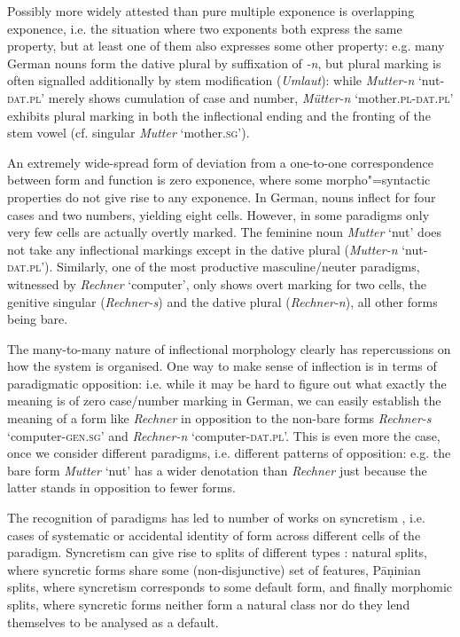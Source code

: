 \documentclass[output=paper
                ,modfonts
                ,nonflat
	        ,collection
	        ,collectionchapter
	        ,collectiontoclongg
 	        ,biblatex
                ,babelshorthands
                ,newtxmath
                ,draftmode
                ,colorlinks, citecolor=brown
] {langscibook}
\begin{document}
{Possibly more widely attested than pure multiple exponence is
overlapping exponence, i.e. the situation where two exponents both
express the same property, but at least one of them also expresses
some other property: e.g. many German nouns form the dative plural
by suffixation of \textit{-n}, but plural marking is often signalled
additionally by stem modification (\textit{Umlaut}): while \textit{Mutter-n}
`nut-\textsc{dat.pl}' merely shows cumulation of case and number,
\textit{Mütter-n} `mother.\textsc{pl}-\textsc{dat.pl}' exhibits plural
marking in both the inflectional ending and the fronting of the stem
vowel (cf. singular \textit{Mutter} `mother.\textsc{sg}').     

An extremely wide-spread form of deviation from a one-to-one
correspondence between form and function is zero exponence, where some
morpho"=syntactic properties do not give rise to any exponence. In
German, nouns inflect for four cases and two numbers, yielding
eight cells. However, in some paradigms only very few cells are
actually overtly marked. The feminine noun \textit{Mutter} `nut' does
not take any inflectional markings except in the dative plural
(\textit{Mutter-n} `nut-\textsc{dat.pl}'). Similarly, one of the most
productive masculine/neuter paradigms, witnessed by \textit{Rechner}
`computer', only shows overt marking for two cells, the genitive
singular (\textit{Rechner-s}) and the dative plural
(\textit{Rechner-n}), all other forms being bare.



The many-to-many nature of inflectional morphology clearly has
repercussions on how the system is organised.  One way to make sense
of inflection is in terms of paradigmatic opposition: i.e. while it
may be hard to figure out what exactly the meaning is of zero
case/number marking in German, we can easily establish the meaning of
a form like \textit{Rechner} in opposition to the non-bare forms
\textit{Rechner-s} `computer-\textsc{gen.sg}' and \textit{Rechner-n}
`computer-\textsc{dat.pl}'. This is even more the case, once we
consider different paradigms, i.e. different patterns of
opposition: e.g. the bare form \textit{Mutter} `nut' has a wider
denotation than \textit{Rechner} just because the latter stands in opposition
to fewer forms. 

The recognition of paradigms has led to number of works on syncretism
\citep[see, e.g.][]{Baerman05}, i.e. cases of systematic or accidental
identity of form across different cells of the paradigm. Syncretism
can give rise to splits of different types \citep{Corbett15}: natural splits, where
syncretic forms share some (non-disjunctive) set of features, Pāṇinian
splits, where syncretism corresponds to some default form, and finally
morphomic splits, where syncretic forms neither form a natural class
nor do they lend themselves to be analysed as a default. 

}
\end{document}
